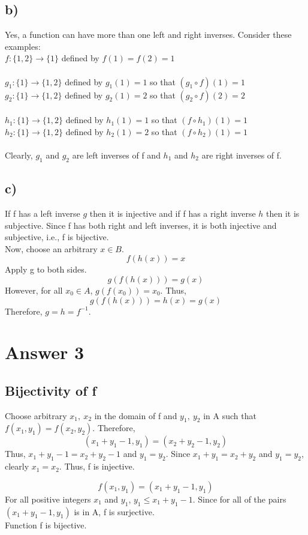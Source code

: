 \documentclass[12pt]{article}
\begin{document}
\subsection*{b)}
Yes, a function can have more than one left and right inverses. Consider these examples:\\
$f:\{1,2\} \rightarrow \{1\}$ defined by $f(1)=f(2)=1$\\\\
$g_1:\{1\} \rightarrow \{1,2\}$ defined by $g_1(1)=1$ so that $(g_1\circ f)(1)=1$ \\
$g_2:\{1\} \rightarrow \{1,2\}$ defined by $g_2(1)=2$ so that $(g_2\circ f)(2)=2$\\\\
$h_1:\{1\} \rightarrow \{1, 2\}$ defined by $h_1(1)=1$ so that $(f\circ h_1)(1)=1$ \\
$h_2:\{1\} \rightarrow \{1, 2\}$ defined by $h_2(1)=2$ so that $(f\circ h_2)(1)=1$\\\\
Clearly, $g_1$ and $g_2$ are left inverses of f and $h_1$ and $h_2$ are right inverses of f.

\subsection*{c)}
If f has a left inverse $g$ then it is injective and if f has a right inverse $h$ then it is subjective. Since f has both right and left inverses, it is both injective and subjective, i.e., f is bijective.\\
Now, choose an arbitrary $x\in B$.
$$f(h(x))=x$$
Apply g to both sides.
$$g(f(h(x)))=g(x)$$
However, for all $x_0 \in A$, $g(f(x_0))=x_0$. Thus,
$$g(f(h(x)))=h(x)=g(x)$$
Therefore, $g=h=f^{-1}$.

\section*{Answer 3}
\subsection*{Bijectivity of f}
Choose arbitrary $x_1,\ x_2$ in the domain of f and $y_1,\ y_2$ in A such that $f(x_1,y_1)=f(x_2,y_2)$. Therefore,
$$(x_1+y_1-1, y_1)=(x_2+y_2-1, y_2)$$
Thus, $x_1+y_1-1=x_2+y_2-1$ and $y_1=y_2$. Since $x_1+y_1=x_2+y_2$ and $y_1=y_2$, clearly $x_1=x_2$. Thus, f is injective.

$$f(x_1,y_1)=(x_1+y_1-1, y_1)$$
For all positive integers $x_1$ and $y_1$, $y_1\le x_1+y_1-1$. Since for all of the pairs $(x_1+y_1-1, y_1)$ is in A, f is surjective.\\
Function f is bijective.
\end{document}
